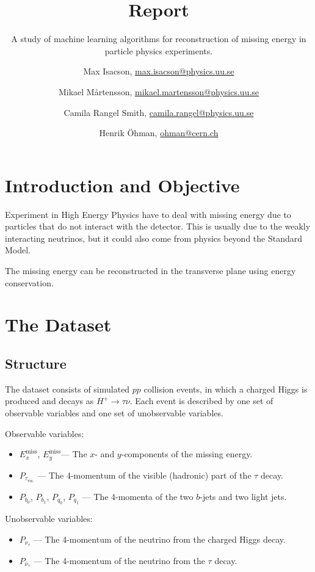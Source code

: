 \documentclass{scrartcl}
\title{Report}
\subtitle{A study of machine learning algorithms for reconstruction of missing energy in particle physics experiments.}
\author{
  Max Isacson, \url{max.isacson@physics.uu.se}
  \and
  Mikael M\aa rtensson, \url{mikael.martensson@physics.uu.se}
  \and
  Camila Rangel Smith, \url{camila.rangel@physics.uu.se}
  \and
  Henrik Öhman, \url{ohman@cern.ch}
}
\newcommand{\exmiss}{$E_x^\text{miss}$}
\newcommand{\eymiss}{$E_y^\text{miss}$}
\begin{document}
\maketitle


\section{Introduction and Objective}

Experiment in High Energy Physics have to deal with missing energy due to particles that do not interact with the detector. This is usually due to the weakly interacting neutrinos, but it could also come from physics beyond the Standard Model.

The missing energy can be reconstructed in the transverse plane using energy conservation. 

\section{The Dataset}
\subsection{Structure}
The dataset consists of simulated $pp$ collision events, in which a charged Higgs is produced and decays as $H^+\to\tau\nu$. Each event is described by one set of observable variables and one set of unobservable variables.

Observable variables:
\begin{itemize}
    \item \exmiss, \eymiss --- The $x$- and $y$-components of the missing energy.
    \item $P_{\tau_\mathrm{vis.}}$ --- The 4-momentum of the visible (hadronic) part of the $\tau$ decay.
    \item $P_{b_0}$, $P_{b_1}$, $P_{q_0}$, $P_{q_1}$ --- The 4-momenta of the two $b$-jets and two light jets.
\end{itemize}

Unobservable variables:
\begin{itemize}
    \item $P_{\nu_\tau}$ --- The 4-momentum of the neutrino from the charged Higgs decay.
    \item $P_{\bar\nu_\tau}$ --- The 4-momentum of the neutrino from the $\tau$ decay.
\end{itemize}
\end{document}
